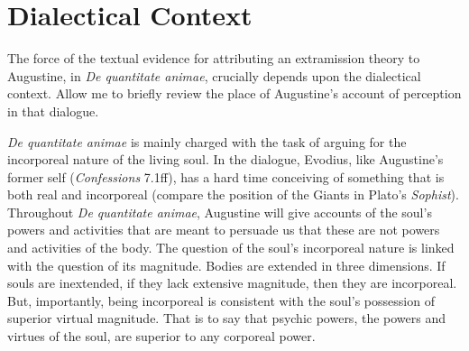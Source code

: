 \documentclass[12pt]{article}
\begin{document}

\section{Dialectical Context} %
\label{sec:dialectical_context}

The force of the textual evidence for attributing an extramission theory to Augustine, in \emph{De quantitate animae}, crucially depends upon the dialectical context. Allow me to briefly review the place of Augustine's account of perception in that dialogue.

\emph{De quantitate animae}  is mainly charged with the task of arguing for the incorporeal nature of the living soul. In the dialogue, Evodius, like Augustine’s former self (\emph{Confessions} 7.1ff), has a hard time conceiving of something that is both real and incorporeal (compare the position of the Giants in Plato's \emph{Sophist}). Throughout \emph{De quantitate animae}, Augustine will give accounts of the soul’s powers and activities that are meant to persuade us that these are not powers and activities of the body. The question of the soul’s incorporeal nature is linked with the question of its magnitude. Bodies are extended in three dimensions. If souls are inextended, if they lack extensive magnitude, then they are incorporeal. But, importantly, being incorporeal is consistent with the soul’s possession of superior virtual magnitude. That is to say that psychic powers, the powers and virtues of the soul, are superior to any corporeal power. 
\end{document}

